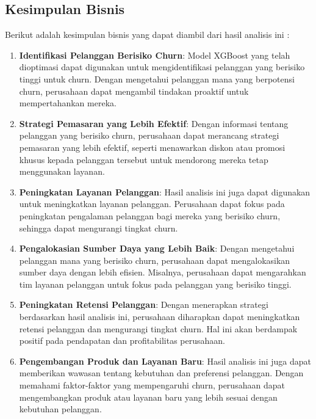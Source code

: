 \subsection{Kesimpulan Bisnis}
Berikut adalah kesimpulan bisnis yang dapat diambil dari hasil analisis ini :

\begin{enumerate}
    \item \textbf{Identifikasi Pelanggan Berisiko Churn}: Model XGBoost yang telah dioptimasi dapat digunakan untuk mengidentifikasi pelanggan yang berisiko tinggi untuk churn. Dengan mengetahui pelanggan mana yang berpotensi churn, perusahaan dapat mengambil tindakan proaktif untuk mempertahankan mereka.
    \item \textbf{Strategi Pemasaran yang Lebih Efektif}: Dengan informasi tentang pelanggan yang berisiko churn, perusahaan dapat merancang strategi pemasaran yang lebih efektif, seperti menawarkan diskon atau promosi khusus kepada pelanggan tersebut untuk mendorong mereka tetap menggunakan layanan.
    \item \textbf{Peningkatan Layanan Pelanggan}: Hasil analisis ini juga dapat digunakan untuk meningkatkan layanan pelanggan. Perusahaan dapat fokus pada peningkatan pengalaman pelanggan bagi mereka yang berisiko churn, sehingga dapat mengurangi tingkat churn.
    \item \textbf{Pengalokasian Sumber Daya yang Lebih Baik}: Dengan mengetahui pelanggan mana yang berisiko churn, perusahaan dapat mengalokasikan sumber daya dengan lebih efisien. Misalnya, perusahaan dapat mengarahkan tim layanan pelanggan untuk fokus pada pelanggan yang berisiko tinggi.
    \item \textbf{Peningkatan Retensi Pelanggan}: Dengan menerapkan strategi berdasarkan hasil analisis ini, perusahaan diharapkan dapat meningkatkan retensi pelanggan dan mengurangi tingkat churn. Hal ini akan berdampak positif pada pendapatan dan profitabilitas perusahaan.
    \item \textbf{Pengembangan Produk dan Layanan Baru}: Hasil analisis ini juga dapat memberikan wawasan tentang kebutuhan dan preferensi pelanggan. Dengan memahami faktor-faktor yang mempengaruhi churn, perusahaan dapat mengembangkan produk atau layanan baru yang lebih sesuai dengan kebutuhan pelanggan.
\end{enumerate}


